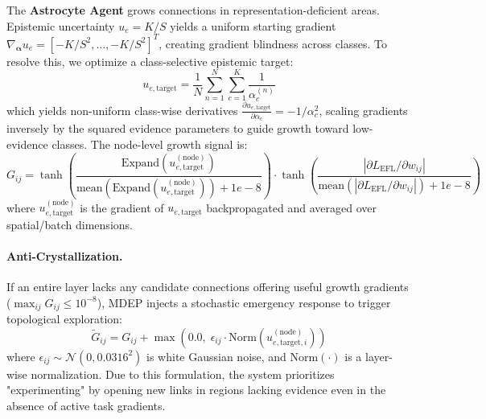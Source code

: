 \documentclass[letterpaper]{article} %
\begin{document}
The \textbf{Astrocyte Agent} grows connections in representation-deficient areas. Epistemic uncertainty $u_e = K/S$ yields a uniform starting gradient $\nabla_{\bm{\alpha}} u_e = [-K/S^2, \ldots, -K/S^2]^T$, creating gradient blindness across classes. To resolve this, we optimize a class-selective epistemic target:
\begin{equation}\label{eq:u_e_target}
    u_{e,\text{target}} = \frac{1}{N} \sum_{n=1}^N \sum_{c=1}^K \frac{1}{\alpha_c^{(n)}}
\end{equation}
which yields non-uniform class-wise derivatives $\frac{\partial u_{e,\text{target}}}{\partial \alpha_c} = -1/\alpha_c^2$, scaling gradients inversely by the squared evidence parameters to guide growth toward low-evidence classes. The node-level growth signal is:
\begin{equation}\label{eq:G_ij}
    G_{ij} = \tanh\!\left(\frac{\text{Expand}(u_{e,\text{target}}^{(\text{node})})}{\text{mean}(\text{Expand}(u_{e,\text{target}}^{(\text{node})})) + 1e-8}\right) \cdot \tanh\!\left(\frac{|\partial L_{\text{EFL}} / \partial w_{ij}|}{\text{mean}(|\partial L_{\text{EFL}} / \partial w_{ij}|) + 1e-8}\right)
\end{equation}
where $u_{e,\text{target}}^{(\text{node})}$ is the gradient of $u_{e,\text{target}}$ backpropagated and averaged over spatial/batch dimensions. 

\paragraph{Anti-Crystallization.} If an entire layer lacks any candidate connections offering useful growth gradients ($\max_{ij} G_{ij} \le 10^{-8}$), MDEP injects a stochastic emergency response to trigger topological exploration:
\begin{equation}\label{eq:anti_crystal_eq}
    \tilde{G}_{ij} = G_{ij} + \max\!\left(0.0,\; \epsilon_{ij} \cdot \text{Norm}(u_{e,\text{target},i}^{(\text{node})})\right)
\end{equation}
where $\epsilon_{ij} \sim \mathcal{N}(0, 0.0316^2)$ is white Gaussian noise, and $\text{Norm}(\cdot)$ is a layer-wise normalization. Due to this formulation, the system prioritizes "experimenting" by opening new links in regions lacking evidence even in the absence of active task gradients.
\end{document}
